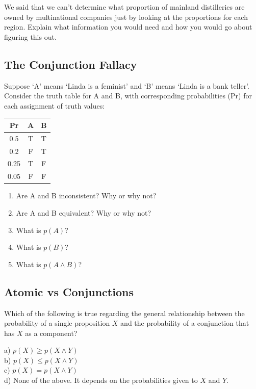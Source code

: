 \documentclass[]{tufte-book}
\begin{document}
We said that we can't determine what proportion of mainland distilleries are owned by multinational companies just by looking at the proportions for each region. Explain what information you would need and how you would go about figuring this out.

\hypertarget{the-conjunction-fallacy}{%
\subsection{The Conjunction Fallacy}\label{the-conjunction-fallacy}}

Suppose `A' means `Linda is a feminist' and `B' means `Linda is a bank teller'. Consider the truth table for A and B, with corresponding probabilities (Pr) for each assignment of truth values:

\begin{longtable}[]{@{}ccc@{}}
\toprule
Pr & A & B\tabularnewline
\midrule
\endhead
0.5 & T & T\tabularnewline
0.2 & F & T\tabularnewline
0.25 & T & F\tabularnewline
0.05 & F & F\tabularnewline
\bottomrule
\end{longtable}

\begin{enumerate}
\def\labelenumi{\arabic{enumi}.}
\item
  Are A and B inconsistent? Why or why not?
\item
  Are A and B equivalent? Why or why not?
\item
  What is \(p(A)\)?
\item
  What is \(p(B)\)?
\item
  What is \(p(A\wedge B)\)?
\end{enumerate}

\hypertarget{atomic-vs-conjunctions}{%
\subsection{Atomic vs Conjunctions}\label{atomic-vs-conjunctions}}

Which of the following is true regarding the general relationship between the probability of a single proposition \(X\) and the probability of a conjunction that has \(X\) as a component?

a) \(p(X)\geq p(X\wedge Y)\)\\
b) \(p(X)\leq p(X\wedge Y)\)\\
\hspace*{0.333em}\hspace*{0.333em}\hspace*{0.333em}c) \(p(X) = p(X\wedge Y)\)\\
\hspace*{0.333em}\hspace*{0.333em}\hspace*{0.333em}d) None of the above. It depends on the probabilities given to \(X\) and \(Y\).
\end{document}
